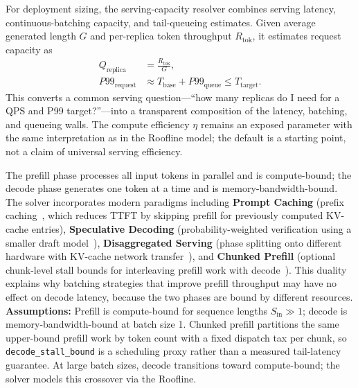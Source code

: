 \documentclass[10pt,twocolumn]{article}
\begin{document}
For deployment sizing, the serving-capacity resolver combines serving latency, continuous-batching capacity, and tail-queueing estimates. Given average generated length $G$ and per-replica token throughput $R_{\text{tok}}$, it estimates request capacity as
\begin{align}
\label{eq:serving-capacity}
Q_{\text{replica}} &= \frac{R_{\text{tok}}}{G}, \\
P99_{\text{request}} &\approx T_{\text{base}} + P99_{\text{queue}} \le T_{\text{target}}.
\end{align}
This converts a common serving question---``how many replicas do I need for a QPS and P99 target?''---into a transparent composition of the latency, batching, and queueing walls. The compute efficiency $\eta$ remains an exposed parameter with the same interpretation as in the Roofline model; the default is a starting point, not a claim of universal serving efficiency.

The prefill phase processes all input tokens in parallel and is compute-bound; the decode phase generates one token at a time and is memory-bandwidth-bound. The solver incorporates modern paradigms including \textbf{Prompt Caching} (prefix caching~\citep{zheng2024sglang}, which reduces TTFT by skipping prefill for previously computed KV-cache entries), \textbf{Speculative Decoding} (probability-weighted verification using a smaller draft model~\citep{leviathan2023fast}), \textbf{Disaggregated Serving} (phase splitting onto different hardware with KV-cache network transfer~\citep{patel2024}), and \textbf{Chunked Prefill} (optional chunk-level stall bounds for interleaving prefill work with decode~\citep{agrawal2025}). This duality explains why batching strategies that improve prefill throughput may have no effect on decode latency, because the two phases are bound by different resources. \textbf{Assumptions:} Prefill is compute-bound for sequence lengths $S_{\text{in}} \gg 1$; decode is memory-bandwidth-bound at batch size 1. Chunked prefill partitions the same upper-bound prefill work by token count with a fixed dispatch tax per chunk, so \texttt{decode\_stall\_bound} is a scheduling proxy rather than a measured tail-latency guarantee. At large batch sizes, decode transitions toward compute-bound; the solver models this crossover via the Roofline.
\end{document}
